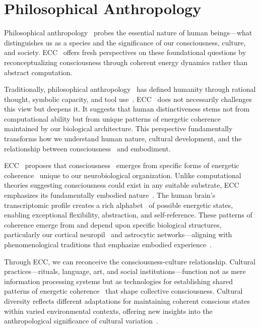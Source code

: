 \section{Philosophical Anthropology~}

Philosophical anthropology~ probes the essential nature of human beings—what distinguishes us as a species and the significance of our consciousness, culture, and society. ECC~ offers fresh perspectives on these foundational questions by reconceptualizing consciousness through coherent energy dynamics rather than abstract computation.

Traditionally, philosophical anthropology~ has defined humanity through rational thought, symbolic capacity, and tool use~\cite{Cassirer1944}. ECC~ does not necessarily challenges this view but deepens it. It suggests that human distinctiveness stems not from computational ability but from unique patterns of energetic coherence~ maintained by our biological architecture. This perspective fundamentally transforms how we understand human nature, cultural development, and the relationship between consciousness~ and embodiment.

ECC~ proposes that consciousness~ emerges from specific forms of energetic coherence~ unique to our neurobiological organization. Unlike computational theories suggesting consciousness could exist in any suitable substrate, ECC~ emphasizes its fundamentally embodied nature~\cite{Heidegger1962, McGilchrist2019}. The human brain's transcriptomic profile creates a rich alphabet~ of possible energetic states, enabling exceptional flexibility, abstraction, and self-reference. These patterns of coherence emerge from and depend upon specific biological structures, particularly our cortical neuropil~ and astrocytic networks—aligning with phenomenological traditions that emphasize embodied experience~\cite{Husserl1991}.

Through ECC, we can reconceive the consciousness-culture relationship. Cultural practices—rituals, language, art, and social institutions—function not as mere information processing systems but as technologies for establishing shared patterns of energetic coherence~ that shape collective consciousness. Cultural diversity reflects different adaptations for maintaining coherent conscious states within varied environmental contexts, offering new insights into the anthropological significance of cultural variation~\cite{Brown1991}.

